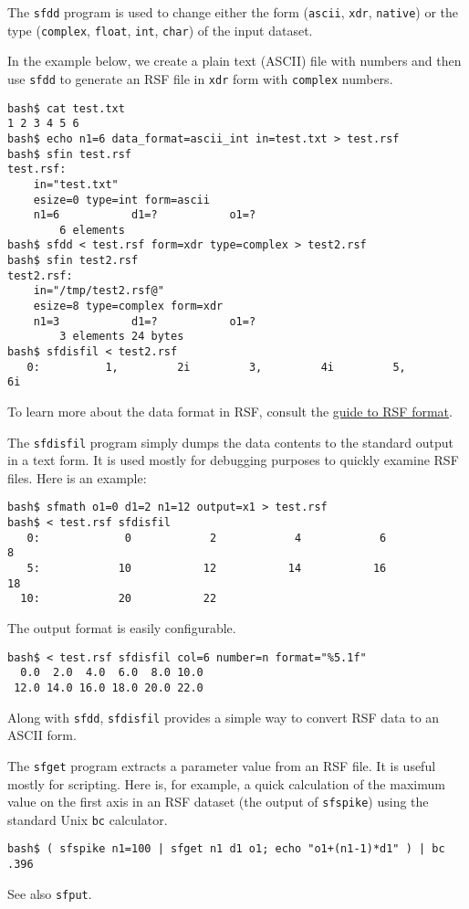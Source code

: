 \noindent\doublebox{\parbox{\textwidth}{

}}

The \texttt{sfdd} program is used to change either the form (\texttt{ascii},
\texttt{xdr}, \texttt{native}) or the type (\texttt{complex}, \texttt{float},
\texttt{int}, \texttt{char}) of the input dataset. 

In the example below, we create a plain text (ASCII) file with numbers and
then use \texttt{sfdd} to generate an RSF file in \texttt{xdr} form with
\texttt{complex} numbers. 
\begin{verbatim}
bash$ cat test.txt
1 2 3 4 5 6
bash$ echo n1=6 data_format=ascii_int in=test.txt > test.rsf
bash$ sfin test.rsf
test.rsf:
    in="test.txt"
    esize=0 type=int form=ascii
    n1=6           d1=?           o1=?
        6 elements
bash$ sfdd < test.rsf form=xdr type=complex > test2.rsf
bash$ sfin test2.rsf
test2.rsf:
    in="/tmp/test2.rsf@"
    esize=8 type=complex form=xdr
    n1=3           d1=?           o1=?
        3 elements 24 bytes
bash$ sfdisfil < test2.rsf
   0:          1,         2i         3,         4i         5,         6i
\end{verbatim}

To learn more about the data format in RSF, consult the
\href{http://egl.beg.utexas.edu/RSF/book/rsf/rsf/format_html/}{guide to RSF
  format}.

\noindent\doublebox{\parbox{\textwidth}{

}}

The \texttt{sfdisfil} program simply dumps the data contents to the standard
output in a text form. It is used mostly for debugging purposes to quickly
examine RSF files. Here is an example:
\begin{verbatim}
bash$ sfmath o1=0 d1=2 n1=12 output=x1 > test.rsf
bash$ < test.rsf sfdisfil
   0:             0            2            4            6            8
   5:            10           12           14           16           18
  10:            20           22
\end{verbatim}
The output format is easily configurable.
\begin{verbatim}
bash$ < test.rsf sfdisfil col=6 number=n format="%5.1f"
  0.0  2.0  4.0  6.0  8.0 10.0
 12.0 14.0 16.0 18.0 20.0 22.0
\end{verbatim}
Along with \texttt{sfdd}, \texttt{sfdisfil} provides a simple way to convert
RSF data to an ASCII form.

\noindent\doublebox{\parbox{\textwidth}{

}}

The \texttt{sfget} program extracts a parameter value from an RSF file. It is
useful mostly for scripting. Here is, for example, a quick calculation of the
maximum value on the first axis in an RSF dataset (the output of
\texttt{sfspike}) using the standard Unix \texttt{bc} calculator.
\begin{verbatim}
bash$ ( sfspike n1=100 | sfget n1 d1 o1; echo "o1+(n1-1)*d1" ) | bc
.396
\end{verbatim}
See also \texttt{sfput}.

